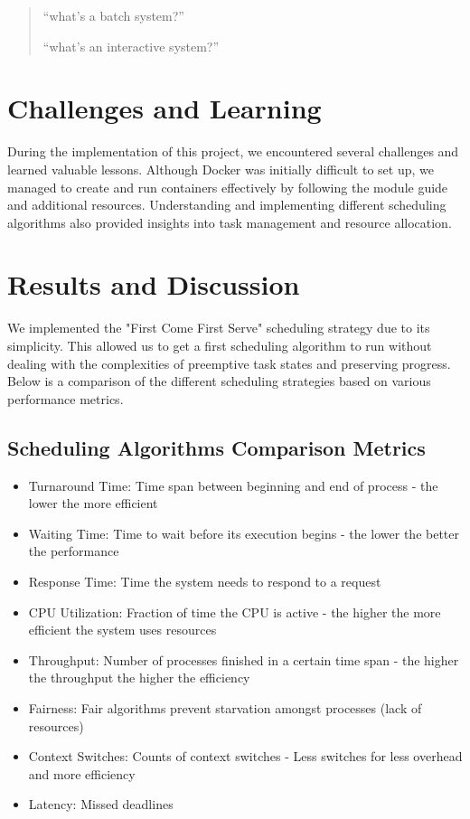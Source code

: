 \documentclass{article}
\begin{document}
\begin{quote}
    ``what’s a batch system?''

    ``what’s an interactive system?''
\end{quote}

\section{Challenges and Learning}
During the implementation of this project, we encountered several challenges and learned valuable lessons. Although Docker was initially difficult to set up, we managed to create and run containers effectively by following the module guide and additional resources. Understanding and implementing different scheduling algorithms also provided insights into task management and resource allocation.

\section{Results and Discussion}
We implemented the "First Come First Serve" scheduling strategy due to its simplicity. This allowed us to get a first scheduling algorithm to run without dealing with the complexities of preemptive task states and preserving progress. Below is a comparison of the different scheduling strategies based on various performance metrics.

\subsection{Scheduling Algorithms Comparison Metrics}
\begin{itemize}
    \item Turnaround Time: Time span between beginning and end of process - the lower the more efficient
    \item Waiting Time: Time to wait before its execution begins - the lower the better the performance
    \item Response Time: Time the system needs to respond to a request
    \item CPU Utilization: Fraction of time the CPU is active - the higher the more efficient the system uses resources
    \item Throughput: Number of processes finished in a certain time span - the higher the throughput the higher the efficiency
    \item Fairness: Fair algorithms prevent starvation amongst processes (lack of resources)
    \item Context Switches: Counts of context switches - Less switches for less overhead and more efficiency
    \item Latency: Missed deadlines
\end{itemize}
\end{document}
